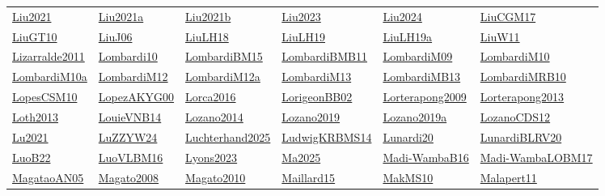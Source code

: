 \begin{longtable}{*{6}{l}}
\hyperref[detail:Liu2021]{Liu2021} & \hyperref[detail:Liu2021a]{Liu2021a} & \hyperref[detail:Liu2021b]{Liu2021b} & \hyperref[detail:Liu2023]{Liu2023} & \hyperref[detail:Liu2024]{Liu2024} & \hyperref[detail:LiuCGM17]{LiuCGM17}\\ 
\hyperref[detail:LiuGT10]{LiuGT10} & \hyperref[detail:LiuJ06]{LiuJ06} & \hyperref[detail:LiuLH18]{LiuLH18} & \hyperref[detail:LiuLH19]{LiuLH19} & \hyperref[detail:LiuLH19a]{LiuLH19a} & \hyperref[detail:LiuW11]{LiuW11}\\ 
\hyperref[detail:Lizarralde2011]{Lizarralde2011} & \hyperref[detail:Lombardi10]{Lombardi10} & \hyperref[detail:LombardiBM15]{LombardiBM15} & \hyperref[detail:LombardiBMB11]{LombardiBMB11} & \hyperref[detail:LombardiM09]{LombardiM09} & \hyperref[detail:LombardiM10]{LombardiM10}\\ 
\hyperref[detail:LombardiM10a]{LombardiM10a} & \hyperref[detail:LombardiM12]{LombardiM12} & \hyperref[detail:LombardiM12a]{LombardiM12a} & \hyperref[detail:LombardiM13]{LombardiM13} & \hyperref[detail:LombardiMB13]{LombardiMB13} & \hyperref[detail:LombardiMRB10]{LombardiMRB10}\\ 
\hyperref[detail:LopesCSM10]{LopesCSM10} & \hyperref[detail:LopezAKYG00]{LopezAKYG00} & \hyperref[detail:Lorca2016]{Lorca2016} & \hyperref[detail:LorigeonBB02]{LorigeonBB02} & \hyperref[detail:Lorterapong2009]{Lorterapong2009} & \hyperref[detail:Lorterapong2013]{Lorterapong2013}\\ 
\hyperref[detail:Loth2013]{Loth2013} & \hyperref[detail:LouieVNB14]{LouieVNB14} & \hyperref[detail:Lozano2014]{Lozano2014} & \hyperref[detail:Lozano2019]{Lozano2019} & \hyperref[detail:Lozano2019a]{Lozano2019a} & \hyperref[detail:LozanoCDS12]{LozanoCDS12}\\ 
\hyperref[detail:Lu2021]{Lu2021} & \hyperref[detail:LuZZYW24]{LuZZYW24} & \hyperref[detail:Luchterhand2025]{Luchterhand2025} & \hyperref[detail:LudwigKRBMS14]{LudwigKRBMS14} & \hyperref[detail:Lunardi20]{Lunardi20} & \hyperref[detail:LunardiBLRV20]{LunardiBLRV20}\\ 
\hyperref[detail:LuoB22]{LuoB22} & \hyperref[detail:LuoVLBM16]{LuoVLBM16} & \hyperref[detail:Lyons2023]{Lyons2023} & \hyperref[detail:Ma2025]{Ma2025} & \hyperref[detail:Madi-WambaB16]{Madi-WambaB16} & \hyperref[detail:Madi-WambaLOBM17]{Madi-WambaLOBM17}\\ 
\hyperref[detail:MagataoAN05]{MagataoAN05} & \hyperref[detail:Magato2008]{Magato2008} & \hyperref[detail:Magato2010]{Magato2010} & \hyperref[detail:Maillard15]{Maillard15} & \hyperref[detail:MakMS10]{MakMS10} & \hyperref[detail:Malapert11]{Malapert11}\\ 

\end{longtable}
